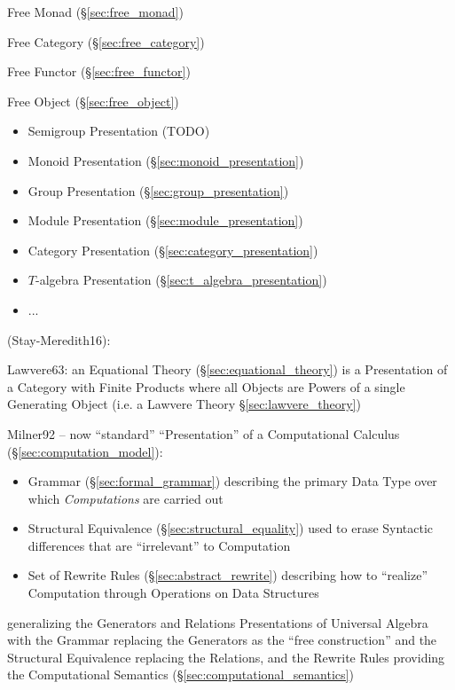 Free Monad (\S\ref{sec:free_monad})

Free Category (\S\ref{sec:free_category})

Free Functor (\S\ref{sec:free_functor})

Free Object (\S\ref{sec:free_object})

\begin{itemize}
  \item Semigroup Presentation (TODO)
  \item Monoid Presentation (\S\ref{sec:monoid_presentation})
  \item Group Presentation (\S\ref{sec:group_presentation})
  \item Module Presentation (\S\ref{sec:module_presentation})
  \item Category Presentation (\S\ref{sec:category_presentation})
  \item $T$-algebra Presentation (\S\ref{sec:t_algebra_presentation})
  \item ...
\end{itemize}

\asterism

(Stay-Meredith16):

Lawvere63: an Equational Theory (\S\ref{sec:equational_theory}) is a
Presentation of a Category with Finite Products where all Objects are Powers of
a single Generating Object (i.e. a Lawvere Theory \S\ref{sec:lawvere_theory})

Milner92 \cite{milner92} -- now ``standard'' ``Presentation'' of a Computational
Calculus (\S\ref{sec:computation_model}):
\begin{itemize}
  \item Grammar (\S\ref{sec:formal_grammar}) describing the primary Data Type
    over which \emph{Computations} are carried out
  \item Structural Equivalence (\S\ref{sec:structural_equality}) used to erase
    Syntactic differences that are ``irrelevant'' to Computation
  \item Set of Rewrite Rules (\S\ref{sec:abstract_rewrite}) describing how to
    ``realize'' Computation through Operations on Data Structures
\end{itemize}
generalizing the Generators and Relations Presentations of Universal Algebra
with the Grammar replacing the Generators as the ``free construction'' and the
Structural Equivalence replacing the Relations, and the Rewrite Rules providing
the Computational Semantics (\S\ref{sec:computational_semantics})



